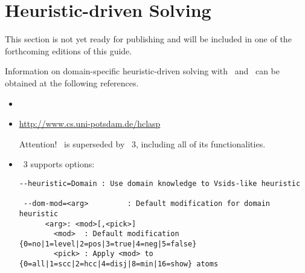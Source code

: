 
\section{Heuristic-driven Solving}
\label{sec:heuristic}

This section is not yet ready for publishing
and will be included in one of the forthcoming editions of this guide.

Information on domain-specific heuristic-driven solving with \clasp\ and \clingo\ can be obtained at the following references.

\begin{itemize}
\item \cite{gekaotroscwa13a}
\item \url{http://www.cs.uni-potsdam.de/hclasp}


  Attention! \hclasp\ is superseded by \clasp~3,
  including all of its functionalities.
\item \clasp~3 supports options:
\begin{lstlisting}[numbers=none]
 --heuristic=Domain : Use domain knowledge to Vsids-like heuristic

 --dom-mod=<arg>         : Default modification for domain heuristic
      <arg>: <mod>[,<pick>]
        <mod>  : Default modification {0=no|1=level|2=pos|3=true|4=neg|5=false}
        <pick> : Apply <mod> to {0=all|1=scc|2=hcc|4=disj|8=min|16=show} atoms
\end{lstlisting}
\end{itemize}


